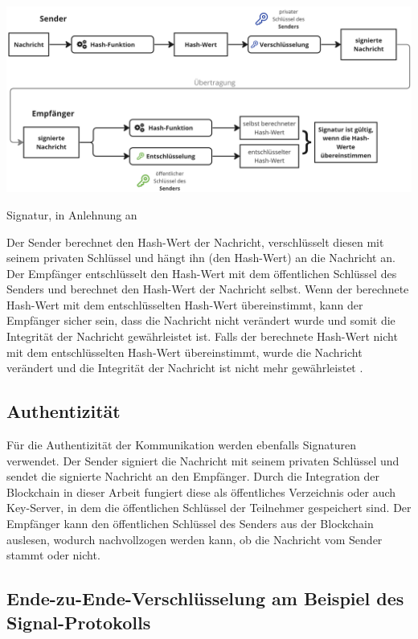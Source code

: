 \begin{center}
    \captionsetup{type=figure}
    \includegraphics[width=1\linewidth]{images/signatur.png}
    \caption{Signatur, in Anlehnung an \cite{DocuSign_digitaleSignaturen}}
    \label{fig:signatur}
\end{center}

\noindent Der Sender berechnet den Hash-Wert der Nachricht, verschlüsselt diesen mit seinem privaten Schlüssel und hängt ihn (den Hash-Wert) an die Nachricht an. Der Empfänger entschlüsselt den Hash-Wert mit dem öffentlichen Schlüssel des Senders und berechnet den Hash-Wert der Nachricht selbst. Wenn der berechnete Hash-Wert mit dem entschlüsselten Hash-Wert übereinstimmt, kann der Empfänger sicher sein, dass die Nachricht nicht verändert wurde und somit die Integrität der Nachricht gewährleistet ist. Falls der berechnete Hash-Wert nicht mit dem entschlüsselten Hash-Wert übereinstimmt, wurde die Nachricht verändert und die Integrität der Nachricht ist nicht mehr gewährleistet \Parencite[S. 73-78]{Hellmann_IT-Sicherheit}. 


\subsection{Authentizität}

Für die Authentizität der Kommunikation werden ebenfalls Signaturen verwendet. Der Sender signiert die Nachricht mit seinem privaten Schlüssel und sendet die signierte Nachricht an den Empfänger. Durch die Integration der Blockchain in dieser Arbeit fungiert diese als öffentliches Verzeichnis oder auch Key-Server, in dem die öffentlichen Schlüssel der Teilnehmer gespeichert sind. Der Empfänger kann den öffentlichen Schlüssel des Senders aus der Blockchain auslesen, wodurch nachvollzogen werden kann, ob die Nachricht vom Sender stammt oder nicht.

\subsection{Ende-zu-Ende-Verschlüsselung am Beispiel des Signal-Protokolls}

